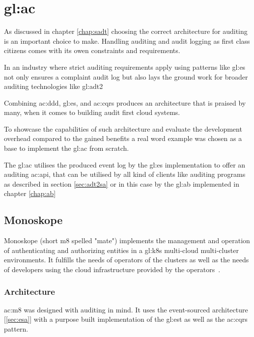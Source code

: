 %
\chapter{\gls{gl:ac}}\label{chap:ac}

As discussed in chapter \ref{chap:sadt} choosing the correct architecture for auditing is an important choice to make. Handling auditing and audit logging as first class citizens comes with its owen constraints and requirements.

In an industry where strict auditing requirements apply using patterns like \gls{gl:es} not only ensures a complaint audit log but also lays the ground work for broader auditing technologies like \gls{gl:adt2}

Combining \gls{ac:ddd}, \gls{gl:es}, and \gls{ac:cqrs} produces an architecture that is praised by many, when it comes to building audit first cloud systems.

To showcase the capabilities of such architecture and evaluate the development overhead compared to the gained benefits a real word example was chosen as a base to implement the \gls{gl:ac} from scratch.

The \gls{gl:ac} utilises the produced event log by the \gls{gl:es} implementation to offer an auditing \gls{ac:api}, that can be utilised by all kind of clients like auditing programs as described in section \ref{sec:adt2sa} or in this case by the \gls{gl:ab} implemented in chapter \ref{chap:ab}

\pagebreak

\section{Monoskope}\label{sec:m8}

Monoskope (short m8 spelled "mate") implements the management and operation of authenticating and authorizing entities in a \gls{gl:k8s} multi-cloud multi-cluster environments. It fulfills the needs of operators of the clusters as well as the needs of developers using the cloud infrastructure provided by the operators~\citep{monoskope}.

\subsection{Architecture}

\Gls{ac:m8} was designed with auditing in mind. It uses the event-sourced architecture [\ref{sec:esa}] with a purpose built implementation of the \gls{gl:est} as well as the \gls{ac:cqrs} pattern.

